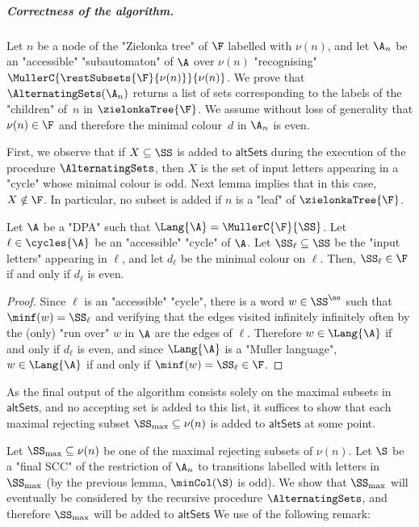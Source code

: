 \documentclass{theoretics}
\begin{document}
\subparagraph*{Correctness of the algorithm.}
Let $n$ be a node of the "Zielonka tree" of $\F$ labelled with $\nu(n)$, and let $\A_n$ be an "accessible" "subautomaton" of $\A$ over $\nu(n)$ "recognising" $\MullerC{\restSubsets{\F}{\nu(n)}}{\nu(n)}$.
We prove that $\AlternatingSets(\A_n)$ returns a list of sets corresponding to the labels of the "children" of~$n$ in $\zielonkaTree{\F}$. We assume without loss of generality that $\nu(n)\in \F$ and therefore the minimal colour~$d$ in $\A_n$ is even.


First, we observe that if $X\subseteq \SS$ is added to $\mathsf{altSets}$ during the execution of the procedure $\AlternatingSets$, then $X$ is the set of input letters appearing in a "cycle" whose minimal colour is odd.
Next lemma implies that in this case, $X\notin \F$.
In particular, no subset is added if $n$ is a "leaf" of $\zielonkaTree{\F}$.

\begin{lemma}\label{lemma-minm:SCC-determines-acceptance}
	Let $\A$ be a "DPA" such that $\Lang{\A} = \MullerC{\F}{\SS}$.
	Let $\ell\in \cycles{\A}$ be an "accessible" "cycle" of $\A$. Let $\SS_\ell\subseteq \SS$ be the "input letters" appearing in $\ell$, and let $d_\ell$ be the minimal colour on $\ell$. Then, $\SS_\ell \in \F$ if and only if $d_\ell$ is even. 
\end{lemma}
\begin{proof}
	Since $\ell$ is an "accessible" "cycle", there is a word $w\in \SS^\oo$ such that $\minf(w) = \SS_\ell$ and verifying that the edges visited infinitely infinitely often by the (only) "run over" $w$ in $\A$ are the edges of $\ell$. Therefore $w\in \Lang{\A}$ if and only if $d_\ell$ is even, and since $\Lang{\A}$ is a "Muller language", $w\in \Lang{\A}$ if and only if $\minf(w) = \SS_\ell \in \F$.
\end{proof}

As the final output of the algorithm consists solely on the maximal subsets in $\mathsf{altSets}$, and no accepting set is added to this list, it suffices to show that each maximal rejecting subset $\SS_{\max}\subseteq \nu(n)$ is added to $\mathsf{altSets}$ at some point.

Let $\SS_{\max}\subseteq \nu(n)$ be one of the maximal rejecting subsets of $\nu(n)$. Let $\S$ be a "final SCC" of the restriction of $\A_n$ to transitions labelled with letters in $\SS_{\max}$ (by the previous lemma, $\minCol(\S)$ is odd).  We show that $\SS_{\max}$ will eventually be considered by the recursive procedure $\AlternatingSets$, and therefore $\SS_{\max}$ will be added to $\mathsf{altSets}$ 
We use of the following remark:
\end{document}
